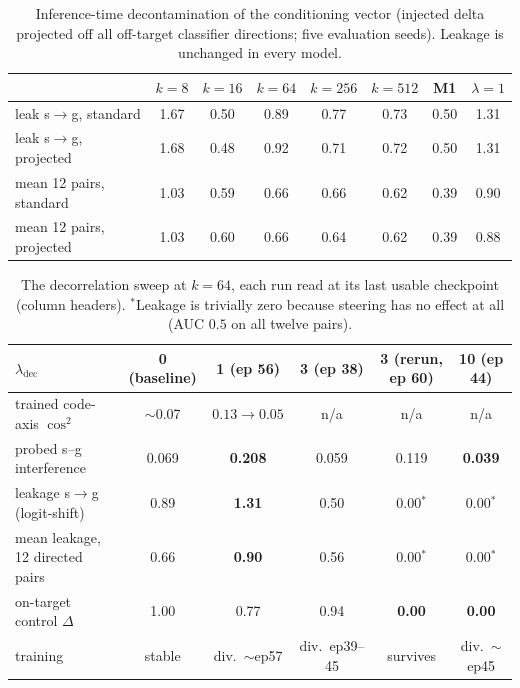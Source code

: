 \documentclass[11pt]{article}
\begin{document}
\begin{table}[h]\centering\small
\begin{tabular}{l ccccccc}
& $k{=}8$ & $k{=}16$ & $k{=}64$ & $k{=}256$ & $k{=}512$ & M1 & $\lambda{=}1$ \\
\hline
leak s$\to$g, standard        & 1.67 & 0.50 & 0.89 & 0.77 & 0.73 & 0.50 & 1.31 \\
leak s$\to$g, projected       & 1.68 & 0.48 & 0.92 & 0.71 & 0.72 & 0.50 & 1.31 \\
mean 12 pairs, standard       & 1.03 & 0.59 & 0.66 & 0.66 & 0.62 & 0.39 & 0.90 \\
mean 12 pairs, projected      & 1.03 & 0.60 & 0.66 & 0.64 & 0.62 & 0.39 & 0.88 \\
\end{tabular}
\caption{Inference-time decontamination of the conditioning vector (injected delta
projected off all off-target classifier directions; five evaluation seeds). Leakage
is unchanged in every model.}
\label{tab:embproj}
\end{table}

\begin{table}[h]\centering\small
\begin{tabular}{l ccccc}
$\lambda_{\mathrm{dec}}$ & 0 (baseline) & 1 (ep 56) & 3 (ep 38) & 3 (rerun, ep 60) & 10 (ep 44) \\
\hline
trained code-axis $\cos^2$        & $\sim$0.07 & $0.13\!\to\!0.05$ & n/a & n/a & n/a \\
probed s--g interference          & 0.069 & \textbf{0.208} & 0.059 & 0.119 & \textbf{0.039} \\
leakage s$\to$g (logit-shift)     & 0.89  & \textbf{1.31} & 0.50 & 0.00$^{*}$ & 0.00$^{*}$ \\
mean leakage, 12 directed pairs   & 0.66  & \textbf{0.90} & 0.56 & 0.00$^{*}$ & 0.00$^{*}$ \\
on-target control $\Delta$        & 1.00  & 0.77 & 0.94 & \textbf{0.00} & \textbf{0.00} \\
training                          & stable & div.\ $\sim$ep57 & div.\ ep39--45 & survives & div.\ $\sim$ep45 \\
\end{tabular}
\caption{The decorrelation sweep at $k{=}64$, each run read at its last usable
checkpoint (column headers). $^{*}$Leakage is trivially zero because steering has no
effect at all (AUC $0.5$ on all twelve pairs).}
\label{tab:mitig}
\end{table}
\end{document}
